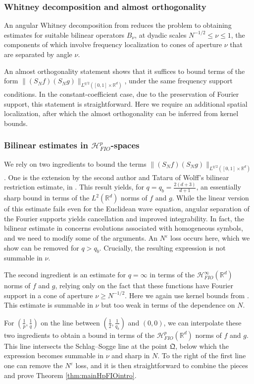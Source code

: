 \documentclass{amsart}
\numberwithin{equation}{section}
\theoremstyle{definition}
\newcommand{\R}{\mathbb{R}}
\newcommand{\Rd}{\mathbb{R}^{d}}
\newcommand {\HT}{\mathcal{H}}
\newcommand {\Hp}{\mathcal{H}^{p}_{FIO}(\R^d)}
\newcommand {\veps}{\varepsilon}
\begin{document}
\subsubsection{Whitney decomposition and almost orthogonality}
An angular Whitney decomposition from \cite{TaoVargas2000}  reduces the problem to obtaining estimates for suitable bilinear operators $B_{\nu}$, at dyadic scales 
$N^{-1/2}\leq \nu\leq 1$, the components of which involve frequency localization to cones of aperture $\nu$ that are separated by angle $\nu$.  

An almost orthogonality statement shows that it suffices to bound  
terms of the form $\|(S_{N}f)(S_{N}g)\|_{L^{q/2}([0,1]\times\Rd)}$, under the same frequency support conditions. 
In the constant-coefficient case, due to the preservation of Fourier support, this statement is straightforward. Here we require an additional spatial localization, after which the almost orthogonality can be inferred from kernel bounds.

\subsubsection{Bilinear estimates in $\mathcal{H}_{FIO}^p$-spaces}
We rely on two ingredients to bound the terms $\|(S_{N}f)(S_{N}g)\|_{L^{q/2}([0,1]\times\Rd)}$. One is the extension by the second author and Tataru 
of Wolff's bilinear restriction estimate, in \cite{SchippaTataru2025}. This result yields, for $q=q_{b}=\frac{2(d+3)}{d+1}$, an essentially sharp bound in terms of the $L^{2}(\Rd)$ norms of $f$ and $g$. 
While the linear version of this estimate fails even for the Euclidean wave equation, angular separation of the Fourier supports yields cancellation and improved integrability. In fact, the bilinear estimate in \cite{SchippaTataru2025} concerns evolutions associated with homogeneous symbols, and  
we need to modify some of the arguments. An $N^{\veps}$ loss occurs here, which we show can be removed for $q>q_{b}$. Crucially, the resulting expression is not summable in $\nu$. 

The second ingredient is an estimate for $q=\infty$ in terms of the $\HT^{\infty}_{FIO}(\Rd)$ norms of $f$ and $g$, 
relying only on the fact that these functions have Fourier support in a cone of aperture $\nu\geq N^{-1/2}$. Here we again use 
kernel bounds from \cite{GebaTataru2007}. This estimate is summable in $\nu$ but too weak in terms of the dependence on $N$.

For $(\frac{1}{p},\frac{1}{q})$ on the line between $(\frac{1}{2},\frac{1}{q_{b}})$ and $(0,0)$, we can interpolate these two ingredients to obtain a bound 
in terms of the $\Hp$ norms of $f$ and $g$. This line intersects the Schlag--Sogge line at the point $\mathfrak{Q}$, 
below which the expression becomes summable in $\nu$ and sharp in $N$. To the right of the first line one can remove the $N^{\veps}$ loss, and it is then straightforward to combine the pieces 
and prove Theorem \ref{thm:mainHpFIOintro}.
\end{document}
